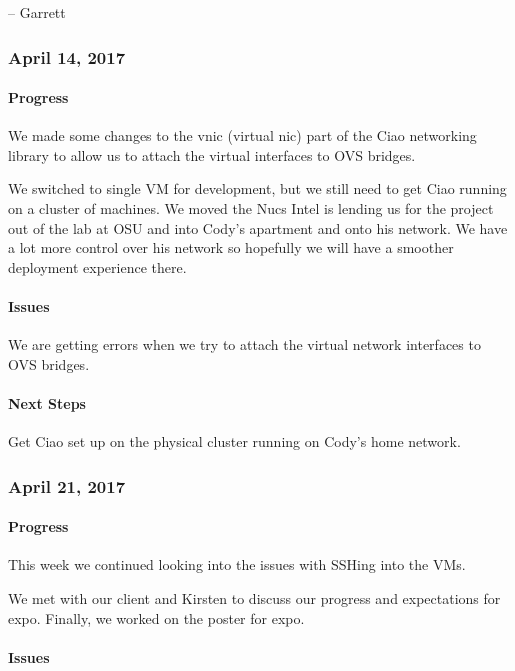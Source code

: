 \documentclass[10pt,onecolumn,journal,draftclsnofoot]{IEEEtran}
\begin{document}
-- Garrett

\subsubsection{April 14, 2017} 

\paragraph{Progress} 

We made some changes to the vnic (virtual nic) part of the Ciao
networking library to allow us to attach the virtual interfaces to OVS
bridges.

We switched to single VM for development, but we still need to get Ciao
running on a cluster of machines. We moved the Nucs Intel is lending us
for the project out of the lab at OSU and into Cody's apartment and onto
his network. We have a lot more control over his network so hopefully we
will have a smoother deployment experience there.

\paragraph{Issues} 

We are getting errors when we try to attach the virtual network
interfaces to OVS bridges.

\paragraph{Next Steps} 

Get Ciao set up on the physical cluster running on Cody's home network.

\subsubsection{April 21, 2017} 

\paragraph{Progress} 

This week we continued looking into the issues with SSHing into the VMs.

We met with our client and Kirsten to discuss our progress and
expectations for expo. Finally, we worked on the poster for expo.

\paragraph{Issues} 
\end{document}

